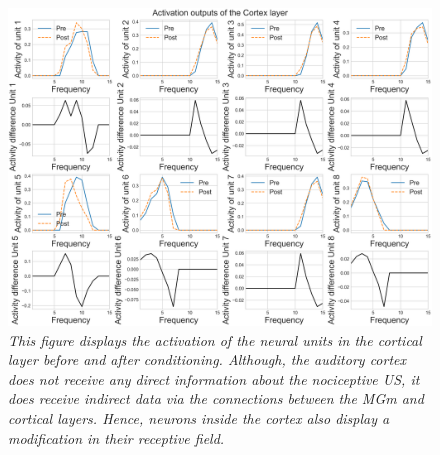 \begin{figure}[!htbp]
   \begin{center}
      \includegraphics[width=\textwidth]{Figs/activation_cortex}
      \caption{\textit{This figure displays the activation of the neural units in the cortical layer before and after conditioning. Although, the auditory cortex does not receive any direct information about the nociceptive US, it does receive indirect data via the connections between the MGm and cortical layers. Hence, neurons inside the cortex also display a modification in their receptive field.}}\label{fig:armony_act_cortex}
   \end{center}
\end{figure}

